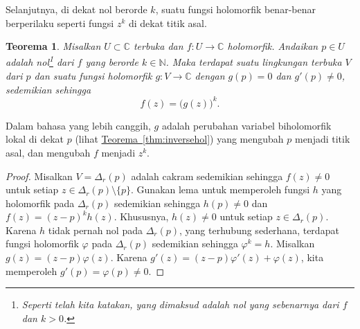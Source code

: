 \documentclass[12pt,openany]{book}
\newcommand{\C}{{\mathbb{C}}}
\newcommand{\N}{{\mathbb{N}}}
\theoremstyle{plain}
\newtheorem{thm}{Teorema}[section]
\theoremstyle{remark}
\theoremstyle{definition}
\theoremstyle{exercise}
\theoremstyle{example}
\newcommand{\thmref}[1]{\hyperref[#1]{Teorema~\ref*{#1}}}
\begin{document}
Selanjutnya, di dekat nol berorde $k$, suatu fungsi holomorfik benar-benar berperilaku seperti
fungsi $z^k$ di dekat titik asal.

\begin{thm}
Misalkan $U \subset \C$ terbuka dan $f \colon U \to \C$ holomorfik.
Andaikan $p \in U$ adalah nol\footnote{Seperti telah kita katakan, yang dimaksud adalah
nol yang sebenarnya dari $f$ dan $k > 0$.}
dari $f$ yang berorde $k \in \N$. Maka terdapat suatu lingkungan terbuka $V$
dari $p$ dan suatu fungsi holomorfik $g \colon V \to \C$ dengan
$g(p) = 0$ dan $g'(p) \neq 0$,
sedemikian sehingga
\begin{equation*}
f(z) = {\bigl( g(z) \bigr)}^k.
\end{equation*}
\end{thm}

Dalam bahasa yang lebih canggih, $g$ adalah perubahan variabel biholomorfik lokal di dekat
$p$ (lihat \thmref{thm:inversehol})
yang mengubah $p$ menjadi titik asal, dan mengubah $f$ menjadi $z^k$.

\begin{proof}
Misalkan $V = \Delta_r(p)$ adalah cakram sedemikian sehingga $f(z) \neq 0$ untuk setiap $z \in
\Delta_r(p) \setminus \{ p \}$. Gunakan lema untuk memperoleh fungsi $h$ yang holomorfik
pada $\Delta_r(p)$ sedemikian sehingga $h(p) \neq 0$ dan $f(z) = {(z-p)}^k h(z)$. Khususnya,
$h(z) \neq 0$ untuk setiap $z \in \Delta_r(p)$.
Karena $h$ tidak pernah nol pada $\Delta_r(p)$, yang terhubung sederhana,
terdapat fungsi holomorfik $\varphi$ pada $\Delta_r(p)$ sedemikian sehingga
$\varphi^k = h$. Misalkan $g(z) = (z-p)\varphi(z)$. Karena
$g'(z) = (z-p) \varphi'(z) + \varphi(z)$, kita memperoleh $g'(p) = \varphi(p) \neq 0$.
\end{proof}
\end{document}
